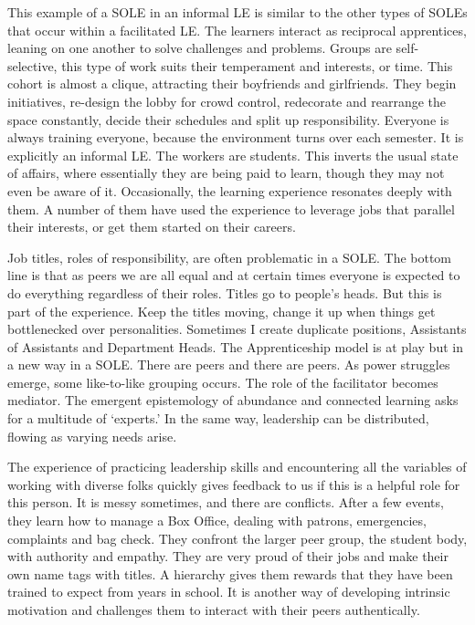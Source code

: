 This example of a SOLE in an informal LE is similar to the other types
of SOLEs that occur within a facilitated LE. The learners interact as
reciprocal apprentices, leaning on one another to solve challenges and
problems. Groups are self-selective, this type of work suits their
temperament and interests, or time. This cohort is almost a clique,
attracting their boyfriends and girlfriends. They begin initiatives,
re-design the lobby for crowd control, redecorate and rearrange the
space constantly, decide their schedules and split up responsibility.
Everyone is always training everyone, because the environment turns over
each semester. It is explicitly an informal LE. The workers are
students. This inverts the usual state of affairs, where essentially
they are being paid to learn, though they may not even be aware of it.
Occasionally, the learning experience resonates deeply with them. A
number of them have used the experience to leverage jobs that parallel
their interests, or get them started on their careers.

Job titles, roles of responsibility, are often problematic in a SOLE.
The bottom line is that as peers we are all equal and at certain times
everyone is expected to do everything regardless of their roles. Titles
go to people's heads. But this is part of the experience. Keep the
titles moving, change it up when things get bottlenecked over
personalities. Sometimes I create duplicate positions, Assistants of
Assistants and Department Heads. The Apprenticeship model is at play but
in a new way in a SOLE. There are peers and there are peers. As power
struggles emerge, some like-to-like grouping occurs. The role of the
facilitator becomes mediator. The emergent epistemology of abundance and
connected learning asks for a multitude of `experts.' In the same way,
leadership can be distributed, flowing as varying needs arise.

The experience of practicing leadership skills and encountering all the
variables of working with diverse folks quickly gives feedback to us if
this is a helpful role for this person. It is messy sometimes, and there
are conflicts. After a few events, they learn how to manage a Box
Office, dealing with patrons, emergencies, complaints and bag check.
They confront the larger peer group, the student body, with authority
and empathy. They are very proud of their jobs and make their own name
tags with titles. A hierarchy gives them rewards that they have been
trained to expect from years in school. It is another way of developing
intrinsic motivation and challenges them to interact with their peers
authentically.

